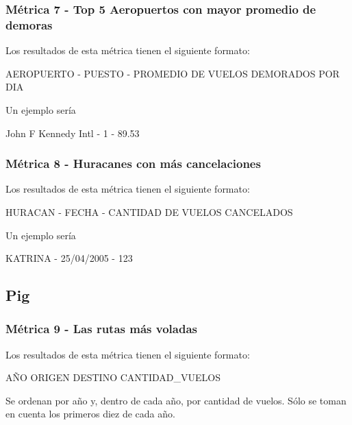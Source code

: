 \documentclass[a4paper,10pt]{article}
\begin{document}
        \subsubsection{Métrica 7 - Top 5 Aeropuertos con mayor promedio de demoras}
        Los resultados de esta métrica tienen el siguiente formato:\\
            \begin{center}
                AEROPUERTO - PUESTO - PROMEDIO DE VUELOS DEMORADOS POR DIA
            \end{center}

            Un ejemplo sería\\
            \begin{center}
            John F Kennedy Intl - 1 - 89.53\\
            \end{center}
        \subsubsection{Métrica 8 - Huracanes con más cancelaciones}
        Los resultados de esta métrica tienen el siguiente formato:\\
            \begin{center}
                HURACAN - FECHA - CANTIDAD DE VUELOS CANCELADOS
            \end{center}

            Un ejemplo sería\\
            \begin{center}
            KATRINA - 25/04/2005 - 123\\
            \end{center}


    \subsection{Pig}
       \subsubsection{Métrica 9 - Las rutas más voladas}
            Los resultados de esta métrica tienen el siguiente formato:\\
            \begin{center}
                AÑO ORIGEN DESTINO CANTIDAD\_VUELOS
            \end{center}
            Se ordenan por año y, dentro de cada año, por cantidad de vuelos. Sólo se toman en cuenta los primeros diez de cada año.
\end{document}
